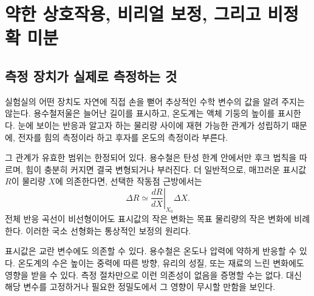 \chapter{약한 상호작용, 비리얼 보정, 그리고 비정확 미분}


\section{측정 장치가 실제로 측정하는 것}

실험실의 어떤 장치도 자연에 직접 손을 뻗어 추상적인 수학 변수의 값을 알려 주지는 않는다. 용수철저울은 늘어난 길이를 표시하고, 온도계는 액체 기둥의 높이를 표시한다. 눈에 보이는 반응과 알고자 하는 물리량 사이에 재현 가능한 관계가 성립하기 때문에, 전자를 힘의 측정이라 하고 후자를 온도의 측정이라 부른다.

그 관계가 유효한 범위는 한정되어 있다. 용수철은 탄성 한계 안에서만 후크 법칙을 따르며, 힘이 충분히 커지면 결국 변형되거나 부러진다. 더 일반적으로, 매끄러운 표시값 \(R\)이 물리량 \(X\)에 의존한다면, 선택한 작동점 근방에서는
\begin{equation}
 \Delta R \simeq
 \left.\frac{dR}{dX}\right|_{X_0}\Delta X.
 \label{eq:sm6-local-linear-response}
\end{equation}
전체 반응 곡선이 비선형이어도 표시값의 작은 변화는 목표 물리량의 작은 변화에 비례한다. 이러한 국소 선형화는 통상적인 보정의 원리다.

표시값은 교란 변수에도 의존할 수 있다. 용수철은 온도나 압력에 약하게 반응할 수 있다. 온도계의 수은 높이는 중력에 따른 방향, 유리의 성질, 또는 재료의 느린 변화에도 영향을 받을 수 있다. 측정 절차만으로 이런 의존성이 없음을 증명할 수는 없다. 대신 해당 변수를 고정하거나 필요한 정밀도에서 그 영향이 무시할 만함을 보인다.

\begin{classroomqa}
\end{classroomqa}

